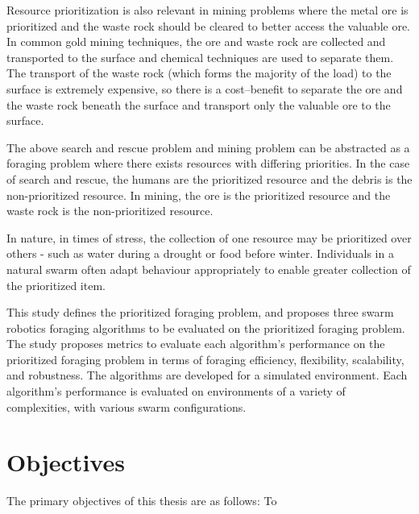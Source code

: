 Resource prioritization is also relevant in mining problems where the metal ore is prioritized and the waste rock should be cleared to better access the valuable ore. In common gold mining techniques, the ore and waste rock are collected and transported to the surface and chemical techniques are used to separate them. The transport of the waste rock (which forms the majority of the load) to the surface is extremely expensive, so there is a cost--benefit to separate the ore and the waste rock beneath the surface and transport only the valuable ore to the surface.

The above search and rescue problem and mining problem can be abstracted as a foraging problem where there exists resources with differing priorities. In the case of search and rescue, the humans are the prioritized resource and the debris is the non-prioritized resource. In mining, the ore is the prioritized resource and the waste rock is the non-prioritized resource. 

In nature, in times of stress, the collection of one resource may be prioritized over others - such as water during a drought or food before winter. Individuals in a natural swarm often adapt behaviour appropriately to enable greater collection of the prioritized item.

This study defines the prioritized foraging problem, and proposes three swarm robotics foraging algorithms to be evaluated on the prioritized foraging problem. The study proposes metrics to evaluate each algorithm's performance on the prioritized foraging problem in terms of foraging efficiency, flexibility, scalability, and robustness. The algorithms are developed for a simulated environment. Each algorithm's performance is evaluated on environments of a variety of complexities, with various swarm configurations.


\section{Objectives}
\label{sec:introduction:objectives}

The primary objectives of this thesis are as follows: To

